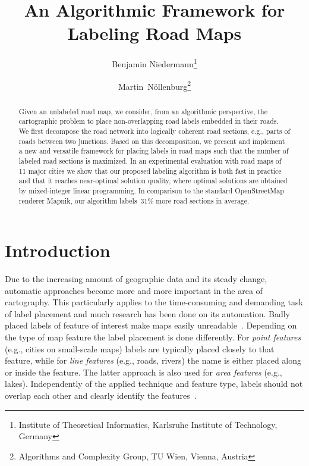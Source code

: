 \documentclass[a4paper,11pt]{article}
\title{An Algorithmic Framework for Labeling Road Maps}
\author{Benjamin Niedermann\thanks{Institute of Theoretical Informatics, Karlsruhe Institute of Technology, Germany} \and Martin~N\"ollenburg\thanks{Algorithms and Complexity Group, TU Wien, Vienna, Austria} }
\date{}
\begin{document}
\maketitle

\begin{abstract} 
  Given an unlabeled road map, we consider, from an algorithmic
  perspective, the cartographic problem to place non-overlapping road
  labels embedded in their roads.  We first decompose the road
  network into logically coherent road sections, e.g., parts of
  roads between two junctions.  Based on this decomposition, we present and implement a new and
  versatile framework for placing labels in road maps such that the
  number of labeled road sections is maximized. 
  In an experimental evaluation with road maps of 11 major cities we show that our proposed labeling algorithm is both fast in practice and that it reaches near-optimal solution quality, where optimal solutions are obtained by mixed-integer linear programming. In comparison to the standard OpenStreetMap renderer Mapnik, our algorithm labels~$31\%$ more road sections in average.
\end{abstract}

\section{Introduction}
Due to the increasing amount of geographic data and its steady change,
automatic approaches become more and more important in the area of
cartography. This particularly applies to the time-consuming and demanding task of label
placement and much research has been done on its automation.
Badly placed labels of feature of interest make maps easily
unreadable~\cite{imhof}. Depending on the type of map feature the label
placement is done differently. For \emph{point features} (e.g., cities
on small-scale maps) labels are typically placed closely to that
feature, while for \emph{line features} (e.g., roads, rivers) the name
is either placed along or inside the feature. The latter approach is
also used for \emph{area features} (e.g., lakes). Independently of the applied technique and feature type, labels should not overlap each other and
clearly identify the features~\cite{criteria}. 
\end{document}
